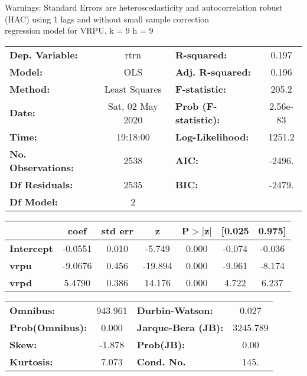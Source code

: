 Warnings: \newline
 [1] Standard Errors are heteroscedasticity and autocorrelation robust (HAC) using 1 lags and without small sample correction\\ 

regression model for VRPU, k = 9 h = 9\begin{center}
\begin{tabular}{lclc}
\toprule
\textbf{Dep. Variable:}    &       rtrn       & \textbf{  R-squared:         } &     0.197   \\
\textbf{Model:}            &       OLS        & \textbf{  Adj. R-squared:    } &     0.196   \\
\textbf{Method:}           &  Least Squares   & \textbf{  F-statistic:       } &     205.2   \\
\textbf{Date:}             & Sat, 02 May 2020 & \textbf{  Prob (F-statistic):} &  2.56e-83   \\
\textbf{Time:}             &     19:18:00     & \textbf{  Log-Likelihood:    } &    1251.2   \\
\textbf{No. Observations:} &        2538      & \textbf{  AIC:               } &    -2496.   \\
\textbf{Df Residuals:}     &        2535      & \textbf{  BIC:               } &    -2479.   \\
\textbf{Df Model:}         &           2      & \textbf{                     } &             \\
\bottomrule
\end{tabular}
\begin{tabular}{lcccccc}
                   & \textbf{coef} & \textbf{std err} & \textbf{z} & \textbf{P$> |$z$|$} & \textbf{[0.025} & \textbf{0.975]}  \\
\midrule
\textbf{Intercept} &      -0.0551  &        0.010     &    -5.749  &         0.000        &       -0.074    &       -0.036     \\
\textbf{vrpu}      &      -9.0676  &        0.456     &   -19.894  &         0.000        &       -9.961    &       -8.174     \\
\textbf{vrpd}      &       5.4790  &        0.386     &    14.176  &         0.000        &        4.722    &        6.237     \\
\bottomrule
\end{tabular}
\begin{tabular}{lclc}
\textbf{Omnibus:}       & 943.961 & \textbf{  Durbin-Watson:     } &    0.027  \\
\textbf{Prob(Omnibus):} &   0.000 & \textbf{  Jarque-Bera (JB):  } & 3245.789  \\
\textbf{Skew:}          &  -1.878 & \textbf{  Prob(JB):          } &     0.00  \\
\textbf{Kurtosis:}      &   7.073 & \textbf{  Cond. No.          } &     145.  \\
\bottomrule
\end{tabular}
\end{center}

